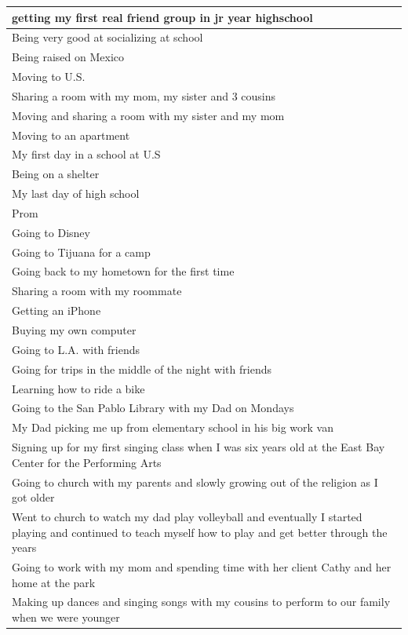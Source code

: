 \documentclass[
  .7em,
  letterpaper,
  DIV=11,
  numbers=noendperiod]{scrartcl}
\begin{document}
\begin{table}
\begin{tabular}{l}
\hline
getting my first real friend group in jr year highschool\\
\hline
Being very good at socializing at school\\
\hline
Being raised on Mexico\\
\hline
Moving to U.S.\\
\hline
Sharing a room with my mom, my sister and 3 cousins\\
\hline
Moving and sharing a room with my sister and my mom\\
\hline
Moving to an apartment\\
\hline
My first day in a school at U.S\\
\hline
Being on a shelter\\
\hline
My last day of high school\\
\hline
Prom\\
\hline
Going to Disney\\
\hline
Going to Tijuana for a camp\\
\hline
Going back to my hometown for the first time\\
\hline
Sharing a room with my roommate\\
\hline
Getting an iPhone\\
\hline
Buying my own computer\\
\hline
Going to L.A. with friends\\
\hline
Going for trips in the middle of the night with friends\\
\hline
Learning how to ride a bike\\
\hline
Going to the San Pablo Library with my Dad on Mondays\\
\hline
My Dad picking me up from elementary school in his big work van\\
\hline
Signing up for my first singing class when I was six years old at the East Bay Center for the Performing Arts\\
\hline
Going to church with my parents and slowly growing out of the religion as I got older\\
\hline
Went to church to watch my dad play volleyball and eventually I started playing and continued to teach myself how to play and get better through the years\\
\hline
Going to work with my mom and spending time with her client Cathy and her home at the park\\
\hline
Making up dances and singing songs with my cousins to perform to our family when we were younger\\
\hline

\end{tabular}
\end{table}
\end{document}
